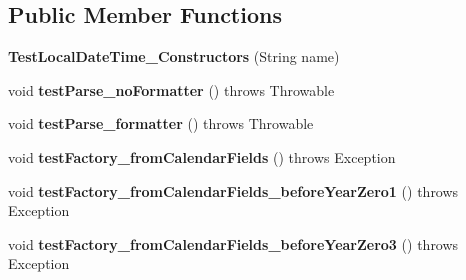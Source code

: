 \subsection*{Public Member Functions}
\begin{DoxyCompactItemize}
\item 
\hypertarget{classorg_1_1joda_1_1time_1_1_test_local_date_time___constructors_a8f84ca2c716b79cc8000e61f59a40e98}{{\bfseries Test\-Local\-Date\-Time\-\_\-\-Constructors} (String name)}\label{classorg_1_1joda_1_1time_1_1_test_local_date_time___constructors_a8f84ca2c716b79cc8000e61f59a40e98}

\item 
\hypertarget{classorg_1_1joda_1_1time_1_1_test_local_date_time___constructors_ad5c6db32f8a631c51ba618b9b789b93b}{void {\bfseries test\-Parse\-\_\-no\-Formatter} ()  throws Throwable }\label{classorg_1_1joda_1_1time_1_1_test_local_date_time___constructors_ad5c6db32f8a631c51ba618b9b789b93b}

\item 
\hypertarget{classorg_1_1joda_1_1time_1_1_test_local_date_time___constructors_ac41368576839a0aea16d0ffafb49e601}{void {\bfseries test\-Parse\-\_\-formatter} ()  throws Throwable }\label{classorg_1_1joda_1_1time_1_1_test_local_date_time___constructors_ac41368576839a0aea16d0ffafb49e601}

\item 
\hypertarget{classorg_1_1joda_1_1time_1_1_test_local_date_time___constructors_aae6b86b08f3ebfde82f7a201abafccbf}{void {\bfseries test\-Factory\-\_\-from\-Calendar\-Fields} ()  throws Exception }\label{classorg_1_1joda_1_1time_1_1_test_local_date_time___constructors_aae6b86b08f3ebfde82f7a201abafccbf}

\item 
\hypertarget{classorg_1_1joda_1_1time_1_1_test_local_date_time___constructors_a8b4d1ff9b61333d9adb342c64fe9b0dd}{void {\bfseries test\-Factory\-\_\-from\-Calendar\-Fields\-\_\-before\-Year\-Zero1} ()  throws Exception }\label{classorg_1_1joda_1_1time_1_1_test_local_date_time___constructors_a8b4d1ff9b61333d9adb342c64fe9b0dd}

\item 
\hypertarget{classorg_1_1joda_1_1time_1_1_test_local_date_time___constructors_a59e28d8071ea1dd0051c2391a8484ff1}{void {\bfseries test\-Factory\-\_\-from\-Calendar\-Fields\-\_\-before\-Year\-Zero3} ()  throws Exception }\label{classorg_1_1joda_1_1time_1_1_test_local_date_time___constructors_a59e28d8071ea1dd0051c2391a8484ff1}


\end{DoxyCompactItemize}
